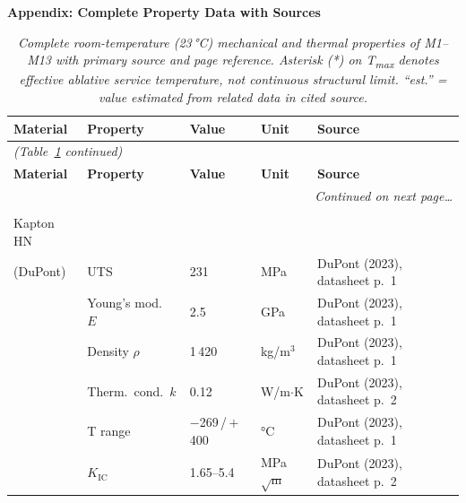\documentclass[11pt,a4paper]{article}
\newcommand{\specialsection}[1]{%
  \vspace{18pt}%
  {\fontsize{12}{14.4}\selectfont\bfseries #1\par}%
  \vspace{6pt}%
}
\renewcommand{\footnotesize}{\fontsize{9}{10.8}\selectfont}
\begin{document}
\specialsection{Appendix: Complete Property Data with Sources}

{\fontsize{8}{9.5}\selectfont
\setlength{\LTpre}{4pt}
\setlength{\LTpost}{4pt}
\begin{longtable}{@{} p{2.5cm} p{2.7cm} p{1.6cm} p{1.0cm} p{5.0cm} @{}}
\caption{\textit{Complete room-temperature (23\,°C) mechanical and thermal
  properties of M1--M13 with primary source and page reference.
  Asterisk (*) on T\textsubscript{max} denotes effective ablative
  service temperature, not continuous structural limit.
  ``est.'' = value estimated from related data in cited source.}}
\label{tab:fulldata} \\
\toprule
\textbf{Material} & \textbf{Property} & \textbf{Value} & \textbf{Unit}
  & \textbf{Source} \\
\midrule
\endfirsthead
\multicolumn{5}{l}{\footnotesize\itshape (Table~\ref{tab:fulldata} continued)} \\
\toprule
\textbf{Material} & \textbf{Property} & \textbf{Value} & \textbf{Unit}
  & \textbf{Source} \\
\midrule
\endhead
\midrule
\multicolumn{5}{r}{\footnotesize\itshape Continued on next page\ldots} \\
\endfoot
\bottomrule
\endlastfoot

\multirow{6}{2.5cm}{\textbf{M1}\\Kapton HN\\(DuPont)}
  & UTS              & 231        & MPa        & DuPont (2023), datasheet p.~1 \\
  & Young's mod.\ $E$& 2.5        & GPa        & DuPont (2023), datasheet p.~1 \\
  & Density $\rho$   & 1\,420     & kg/m$^3$   & DuPont (2023), datasheet p.~1 \\
  & Therm.\ cond.\ $k$ & 0.12     & W/m$\cdot$K & DuPont (2023), datasheet p.~2 \\
  & T range          & $-$269\,/\,$+$400 & °C  & DuPont (2023), datasheet p.~1 \\
  & $K_\mathrm{IC}$  & 1.65--5.4  & MPa$\sqrt{\text{m}}$ & DuPont (2023), datasheet p.~2 \\
\midrule


\end{longtable}}
\end{document}
